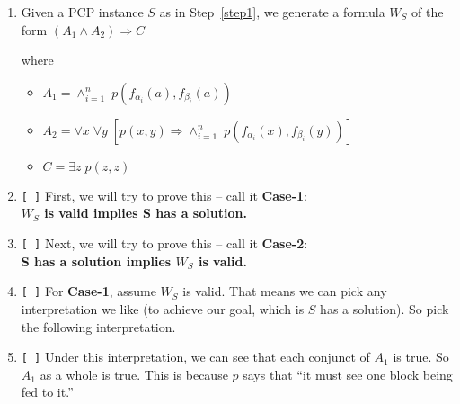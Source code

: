 \documentclass[11pt]{article}
\begin{document}
\begin{Large}
\begin{enumerate}
 \item Given a PCP instance $S$ as in Step~\ref{step1}, we generate a
   formula $W_S$ of the form
     \( (A_1 \wedge A_2) \Rightarrow C \)

   where

   \begin{itemize}
   \item[] $A_1 = 
\textstyle \wedge_{i=1}^{n} \; p(f_{\alpha_i}(a), f_{\beta_i}(a)) \;\;\;\;\;\;\;\;  $ 
\item[] $A_2 = 
\textstyle \forall x\; \forall y\;
  [p(x,y) \Rightarrow \wedge_{i=1}^{n} \; p(f_{\alpha_i}(x), f_{\beta_i}(y))] \;\;\;\;\;\;\;\; $ 
\item[] $C = 
\textstyle \exists z\; p(z,z) \;\;\;\;\;\;\;\; $ 
   \end{itemize}



 \item \verb|[ ]| First, we will try to prove this -- call it {\bf Case-1}:\\
   {\bf $W_S$ is valid implies S has a solution.}

 \item \verb|[ ]| Next, we will try to prove this -- call it {\bf Case-2}:\\
   {\bf S has a solution implies $W_S$ is valid.}

 \item \verb|[ ]| For {\bf Case-1}, assume $W_S$ is valid. That
   means we can pick any interpretation we like (to achieve our goal,
   which is $S$ has a solution). So pick the following interpretation.

   

\item \verb|[ ]| Under this interpretation, we can see that each
  conjunct of $A_1$ is true. So $A_1$ as a whole is true. This is
  because $p$ says that ``it must see one block being
  fed to it.''


\end{enumerate}
\end{Large}
\end{document}
